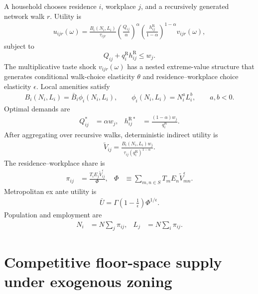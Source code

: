 \documentclass[12pt,a4paper]{article}
\newcommand{\R}{\mathrm{R}}
\newcommand{\1}{\mathbb 1}
\begin{document}
A household chooses residence $i$, workplace $j$, and a recursively generated network walk $r$. Utility is
\begin{align}
u_{ijr}(\omega)
=
\frac{B_i(N_i,L_i)}{\tau_{ijr}}
\left(\frac{Q_{ij}}{\alpha}\right)^{\alpha}
\left(\frac{h_{ij}^{\R}}{1-\alpha}\right)^{1-\alpha}
v_{ijr}(\omega),
\label{eq:household-utility}
\end{align}
subject to
\[
Q_{ij}+q_i^{\R}h_{ij}^{\R}\leq w_j.
\]
The multiplicative taste shock $v_{ijr}(\omega)$ has a nested
extreme-value structure that generates conditional walk-choice
elasticity $\theta$ and residence--workplace choice elasticity
$\epsilon$.
Local amenities satisfy
\begin{align}
B_i(N_i,L_i)
=
\bar B_i \phi_i(N_i,L_i),
\qquad
\phi_i(N_i,L_i)=N_i^aL_i^b,
\qquad a,b<0.
\label{eq:amenity}
\end{align}
Optimal demands are
\begin{align}
Q_{ij}^*&=\alpha w_j,
&
h_{ij}^{\R*}&=\frac{(1-\alpha)w_j}{q_i^{\R}}.
\label{eq:household-demands}
\end{align}
After aggregating over recursive walks, deterministic indirect utility is
\begin{align}
\widetilde V_{ij}
=
\frac{B_i(N_i,L_i)w_j}
{\tau_{ij}(q_i^{\R})^{1-\alpha}}.
\label{eq:indirect-utility}
\end{align}
The residence--workplace share is
\begin{align}
\pi_{ij}
&=
\frac{T_iE_j\widetilde V_{ij}^{\epsilon}}{\Phi},
&
\Phi
&\equiv
\sum_{m,n\in S}T_mE_n\widetilde V_{mn}^{\epsilon}.
\label{eq:od-share}
\end{align}
Metropolitan ex ante utility is
\begin{align}
\bar U
=
\Gamma\!\left(1-\frac1\epsilon\right)\Phi^{1/\epsilon}.
\label{eq:expected-utility}
\end{align}
Population and employment are
\begin{align}
N_i&=N\sum_j\pi_{ij},
&
L_j&=N\sum_i\pi_{ij}.
\label{eq:population-employment}
\end{align}

\section{Competitive floor-space supply under exogenous zoning}
\end{document}
